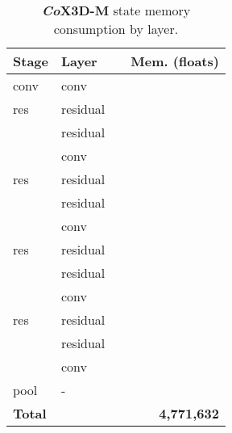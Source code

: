 \documentclass[runningheads]{llncs}
\begin{document}
\begin{table}
\begin{center}
\begin{tabular}{llrr}
    \toprule
    \textbf{Stage}  & \textbf{Layer}        &                                                               & \textbf{Mem.} (floats) \\ 
    \midrule
    conv        & conv     &                      &  \\
    \midrule
    res         & residual          &                      &  \\
                    & residual      &  &  \\
                    & conv          &  &  \\
\midrule
    res         & residual          &                        &  \\
                    & residual      &  &  \\
                    & conv          &   &  \\
\midrule
    res         & residual          &                         &  \\
                    & residual     &  &  \\
                    & conv         &   &  \\
\midrule
    res         & residual          &                        &  \\
                    & residual      &   &  \\
                    & conv          &   &  \\
\midrule
    pool        & -                     &                                          &  \\
    \bottomrule
    \textbf{Total}  &                       &                                                               & \textbf{4,771,632} \\ \bottomrule
\end{tabular}
\end{center}
\caption{\textbf{\textit{Co}X3D-M} state memory consumption by layer. }
\label{tab:cox3dm-mem-calc}
\end{table}
\end{document}
